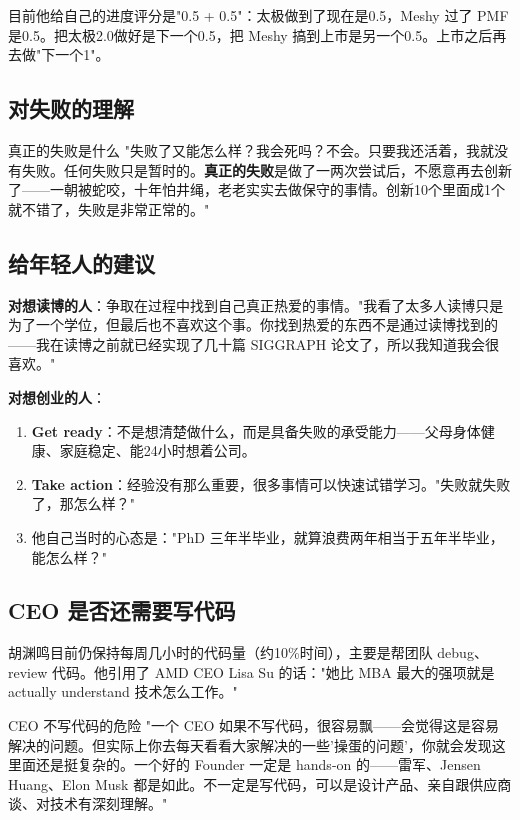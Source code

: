 目前他给自己的进度评分是"0.5 + 0.5"：太极做到了现在是0.5，Meshy 过了 PMF 是0.5。把太极2.0做好是下一个0.5，把 Meshy 搞到上市是另一个0.5。上市之后再去做"下一个1"。

\subsection{对失败的理解}

\begin{importantbox}{真正的失败是什么}
"失败了又能怎么样？我会死吗？不会。只要我还活着，我就没有失败。任何失败只是暂时的。\textbf{真正的失败}是做了一两次尝试后，不愿意再去创新了——一朝被蛇咬，十年怕井绳，老老实实去做保守的事情。创新10个里面成1个就不错了，失败是非常正常的。"
\end{importantbox}

\subsection{给年轻人的建议}

\textbf{对想读博的人}：争取在过程中找到自己真正热爱的事情。"我看了太多人读博只是为了一个学位，但最后也不喜欢这个事。你找到热爱的东西不是通过读博找到的——我在读博之前就已经实现了几十篇 SIGGRAPH 论文了，所以我知道我会很喜欢。"

\textbf{对想创业的人}：
\begin{enumerate}
\item \textbf{Get ready}：不是想清楚做什么，而是具备失败的承受能力——父母身体健康、家庭稳定、能24小时想着公司。
\item \textbf{Take action}：经验没有那么重要，很多事情可以快速试错学习。"失败就失败了，那怎么样？"
\item 他自己当时的心态是："PhD 三年半毕业，就算浪费两年相当于五年半毕业，能怎么样？"
\end{enumerate}

\subsection{CEO 是否还需要写代码}

胡渊鸣目前仍保持每周几小时的代码量（约10\%时间），主要是帮团队 debug、review 代码。他引用了 AMD CEO Lisa Su 的话："她比 MBA 最大的强项就是 actually understand 技术怎么工作。"

\begin{warningbox}{CEO 不写代码的危险}
"一个 CEO 如果不写代码，很容易飘——会觉得这是容易解决的问题。但实际上你去每天看看大家解决的一些'操蛋的问题'，你就会发现这里面还是挺复杂的。一个好的 Founder 一定是 hands-on 的——雷军、Jensen Huang、Elon Musk 都是如此。不一定是写代码，可以是设计产品、亲自跟供应商谈、对技术有深刻理解。"
\end{warningbox}

